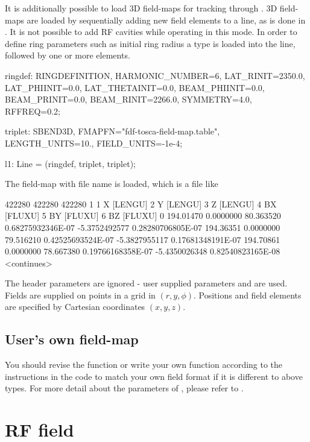It is additionally possible to load 3D field-maps for tracking through \opalcycl.
3D field-maps are loaded by sequentially adding new field elements to a line,
as is done in \opalt. It is not possible to add
RF cavities while operating in this mode. In order to define ring parameters
such as initial ring radius a  type is loaded into the line,
followed by one or more  elements.

\begin{example}
ringdef: RINGDEFINITION, HARMONIC_NUMBER=6, LAT_RINIT=2350.0, LAT_PHIINIT=0.0,
         LAT_THETAINIT=0.0, BEAM_PHIINIT=0.0, BEAM_PRINIT=0.0,
         BEAM_RINIT=2266.0, SYMMETRY=4.0, RFFREQ=0.2;

triplet: SBEND3D, FMAPFN="fdf-tosca-field-map.table", LENGTH_UNITS=10., FIELD_UNITS=-1e-4;

l1: Line = (ringdef, triplet, triplet);
\end{example}

The field-map with file name  is loaded, which is a
file like
\begin{example}
      422280      422280      422280           1
 1 X [LENGU]
 2 Y [LENGU]
 3 Z [LENGU]
 4 BX [FLUXU]
 5 BY [FLUXU]
 6 BZ [FLUXU]
 0
 194.01470 0.0000000 80.363520 0.68275932346E-07 -5.3752492577 0.28280706805E-07
 194.36351 0.0000000 79.516210 0.42525693524E-07 -5.3827955117 0.17681348191E-07
 194.70861 0.0000000 78.667380 0.19766168358E-07 -5.4350026348 0.82540823165E-08
<continues>
\end{example}
The header parameters are ignored - user supplied parameters 
and  are used. Fields are supplied on points in a grid in
$(r, y, \phi)$. Positions and field elements are specified by Cartesian
coordinates $(x, y, z)$.

\subsection{User's own field-map}

{ You should revise the function or write your own function according to the instructions in the code to match your own field
format if it is different to above types.}
For more detail about the parameters of , please refer to .

\section{RF field}
